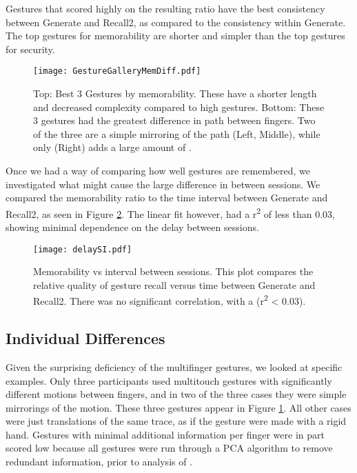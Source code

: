 \documentclass{sig-alternate-10pt}
\begin{document}
Gestures that scored highly on the resulting ratio have the best consistency between Generate and Recall2, as compared to the consistency within Generate. The top gestures for memorability are shorter and simpler than the top gestures for security.

\begin{figure}[!h]
\begin{center}
\texttt{[image: GestureGalleryMemDiff.pdf]}
\caption{Top: Best 3 Gestures by memorability. These have a shorter length and decreased complexity compared to high   gestures. Bottom: These 3 gestures had the greatest difference in path between fingers. Two of the three are a simple mirroring of the path (Left, Middle), while only (Right) adds a large amount of  .}
\label{fig:MemoryRatio}
\label{fig:FDiff1}
\end{center}
\end{figure}









Once we had a way of comparing how well gestures are remembered, we investigated what might cause the large difference in  between sessions. We compared the memorability ratio to the time interval between Generate and Recall2, as seen in Figure \ref{fig:delaySI1}. The linear fit however, had a r\textsuperscript{2} of less than 0.03, showing minimal dependence on the delay between sessions.



\begin{figure}[!h]
\centering
\texttt{[image: delaySI.pdf]}
\caption{Memorability vs interval between sessions. This plot compares the relative quality of gesture recall versus time between Generate and Recall2. There was no significant correlation, with a  (r\textsuperscript{2} < 0.03).}
\label{fig:delaySI1}
\end{figure}








\subsection{Individual Differences}






  Given the surprising deficiency of the multifinger gestures, we looked at specific examples. Only three participants used multitouch gestures with significantly different motions between fingers, and in two of the three cases they were simple mirrorings of the motion. These three gestures appear in Figure \ref{fig:FDiff1}. All other cases were just translations of the same trace, as if the gesture were made with a rigid hand. Gestures with minimal additional information per finger were in part scored low because all gestures were run through a PCA algorithm to remove redundant information, prior to analysis of .
\end{document}
